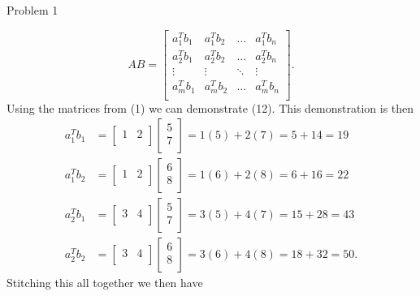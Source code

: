 \begin{problem}{Problem 1}
\begin{highlight}[Solution]
        \begin{equation}
            AB = 
            \begin{bmatrix}
                a_{1}^{T}b_{1} & a_{1}^{T}b_{2} & \dots & a_{1}^{T}b_{n} \\
                a_{2}^{T}b_{1} & a_{2}^{T}b_{2} & \dots & a_{2}^{T}b_{n} \\
                \vdots & \vdots & \ddots & \vdots \\
                a_{m}^{T}b_{1} & a_{m}^{T}b_{2} & \dots & a_{m}^{T}b_{n} \\
            \end{bmatrix}.
        \end{equation}
        Using the matrices from (1) we can demonstrate (12). This demonstration is then
        \begin{align*}
            a_{1}^{T}b_{1} & = 
            \begin{bmatrix}
                1 & 2 \\
            \end{bmatrix}
            \begin{bmatrix}
                5 \\
                7 \\
            \end{bmatrix}
            = 1(5) + 2(7) = 5 + 14 = 19 \\
            a_{1}^{T}b_{2} & = 
            \begin{bmatrix}
                1 & 2 \\
            \end{bmatrix}
            \begin{bmatrix}
                6 \\
                8 \\
            \end{bmatrix}
            = 1(6) + 2(8) = 6 + 16 = 22 \\
            a_{2}^{T}b_{1} & = 
            \begin{bmatrix}
                3 & 4 \\
            \end{bmatrix}
            \begin{bmatrix}
                5 \\
                7 \\
            \end{bmatrix}
            = 3(5) + 4(7) = 15 + 28 = 43 \\
            a_{2}^{T}b_{2} & = 
            \begin{bmatrix}
                3 & 4 \\
            \end{bmatrix}
            \begin{bmatrix}
                6 \\
                8 \\
            \end{bmatrix}
            = 3(6) + 4(8) = 18 + 32 = 50.
        \end{align*}
        Stitching this all together we then have
        

\end{highlight}
\end{problem}
